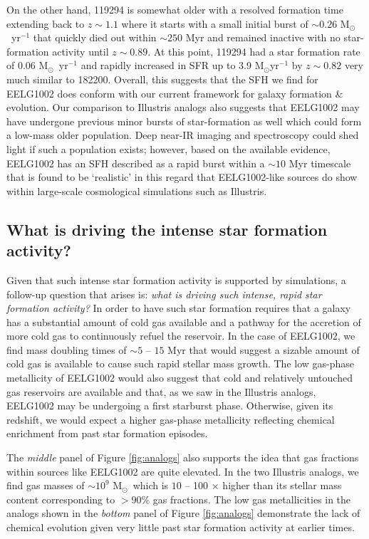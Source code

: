 \documentclass[twocolumn,tight,times,linenumbers]{aastex631}
\newcommand{\msol}{M$_\odot$}
\begin{document}
		On the other hand, 119294 is somewhat older with a resolved formation time extending back to $z \sim 1.1$ where it starts with a small initial burst of $\sim 0.26$ \msol~yr$^{-1}$ that quickly died out within $\sim 250$ Myr and remained inactive with no star-formation activity until $z \sim 0.89$. At this point, 119294 had a star formation rate of $0.06$ \msol~yr$^{-1}$ and rapidly increased in SFR up to 3.9 \msol yr$^{-1}$ by $z \sim 0.82$ very much similar to 182200. Overall, this suggests that the SFH we find for EELG1002 does conform with our current framework for galaxy formation \& evolution. Our comparison to Illustris analogs also suggests that EELG1002 may have undergone previous minor bursts of star-formation as well which could form a low-mass older population. Deep near-IR imaging and spectroscopy could shed light if such a population exists; however, based on the available evidence, EELG1002 has an SFH described as a rapid burst within a $\sim 10$ Myr timescale that is found to be `realistic' in this regard that EELG1002-like sources do show within large-scale cosmological simulations such as Illustris.
	
		
		\subsection{What is driving the intense star formation activity?}
		
		Given that such intense star formation activity is supported by simulations, a follow-up question that arises is: \textit{what is driving such intense, rapid star formation activity?} In order to have such star formation requires that a galaxy has a substantial amount of cold gas available and a pathway for the accretion of more cold gas to continuously refuel the reservoir. In the case of EELG1002, we find mass doubling times of $\sim 5$ -- $15$ Myr that would suggest a sizable amount of cold gas is available to cause such rapid stellar mass growth. The low gas-phase metallicity of EELG1002 would also suggest that cold and relatively untouched gas reservoirs are available and that, as we saw in the Illustris analogs, EELG1002 may be undergoing a first starburst phase. Otherwise, given its redshift, we would expect a higher gas-phase metallicity reflecting chemical enrichment from past star formation episodes. 
		
		The \textit{middle} panel of Figure \ref{fig:analogs} also supports the idea that gas fractions within sources like EELG1002 are quite elevated. In the two Illustris analogs, we find gas masses of $\sim 10^9$ \msol~which is $10$ -- 100 $\times$ higher than its stellar mass content corresponding to $>90$\% gas fractions. The low gas metallicities in the analogs shown in the \textit{bottom} panel of Figure \ref{fig:analogs} demonstrate the lack of chemical evolution given very little past star formation activity at earlier times. 
		
\end{document}
